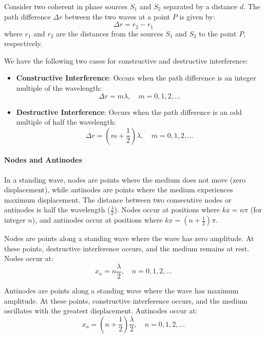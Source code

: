 \documentclass[11pt]{report}
\begin{document}
\begin{definition}[Interference]
    Consider two coherent in phase sources $S_1$ and $S_2$ separated by a distance \( d \). The path difference \( \Delta r \) between the two waves at a point \( P \) is given by:
    $$
        \Delta r = r_2 - r_1
    $$
    where \( r_1 \) and \( r_2 \) are the distances from the sources \( S_1 \) and \( S_2 \) to the point \( P \), respectively.

    We have the following two cases for constructive and destructive interference:
    \begin{itemize}
        \item \textbf{Constructive Interference}: Occurs when the path difference is an integer multiple of the wavelength:
        $$
            \Delta r = m \lambda, \quad m = 0, 1, 2, \ldots
        $$
        \item \textbf{Destructive Interference}: Occurs when the path difference is an odd multiple of half the wavelength:
        $$
            \Delta r = \left(m + \frac{1}{2}\right) \lambda, \quad m = 0, 1, 2, \ldots
        $$
    \end{itemize}
\end{definition}

\paragraph{Nodes and Antinodes} In a standing wave, nodes are points where the medium does not move (zero displacement), while antinodes are points where the medium experiences maximum displacement. The distance between two consecutive nodes or antinodes is half the wavelength (\( \frac{\lambda}{2} \)). Nodes occur at positions where \( kx = n\pi \) (for integer \( n \)), and antinodes occur at positions where \( kx = (n + \frac{1}{2})\pi \).
\begin{definition}[Nodes]
    Nodes are points along a standing wave where the wave has zero amplitude. At these points, destructive interference occurs, and the medium remains at rest. Nodes occur at:
    $$
        x_n = n \frac{\lambda}{2}, \quad n = 0, 1, 2, \ldots
    $$
\end{definition}
\begin{definition}[Antinodes]
    Antinodes are points along a standing wave where the wave has maximum amplitude. At these points, constructive interference occurs, and the medium oscillates with the greatest displacement. Antinodes occur at:
    $$
        x_a = \left(n + \frac{1}{2}\right) \frac{\lambda}{2}, \quad n = 0, 1, 2, \ldots
    $$
\end{definition}
\end{document}
